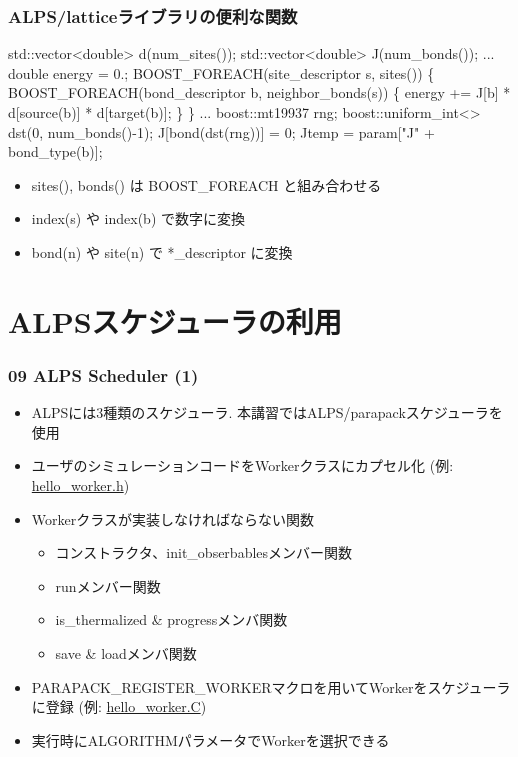 \begin{frame}[fragile,shrink=10] \frametitle{ALPS/latticeライブラリの便利な関数}
\begin{semiverbatim}
std::vector<double> d(\alert{num_sites()});
std::vector<double> J(\alert{num_bonds()});
...
double energy = 0.;
BOOST\_FOREACH(site_descriptor s, \alert{sites()}) \{
  BOOST\_FOREACH(bond_descriptor b, \alert{neighbor_bonds(s)}) \{
    energy += J[b] * d[\alert{source(b)}] * d[\alert{target(b)}];
  \}
\}
...
boost::mt19937 rng;
boost::uniform_int<> dst(0, \alert{num_bonds()}-1);
J[\alert{bond(dst(rng))}] = 0;
Jtemp = param["J" + \alert{bond_type(b)}];
\end{semiverbatim}
  \begin{itemize}
  \item sites(), bonds() は BOOST\_FOREACH と組み合わせる
  \item index(s) や index(b) で数字に変換
  \item bond(n) や site(n) で *\_descriptor に変換
  \end{itemize}
\end{frame}

\section{ALPSスケジューラの利用}
\begin{frame}[fragile]
  \frametitle{09 ALPS Scheduler (1)}
  \begin{itemize}
    \item ALPSには3種類のスケジューラ. 本講習ではALPS/parapackスケジューラを使用
    \item ユーザのシミュレーションコードをWorkerクラスにカプセル化 (例: \href{https://github.com/cmsi/alps-tutorial/blob/develop/alpsize/09-hello_worker.h}{hello\_worker.h})
    \item Workerクラスが実装しなければならない関数
      \begin{itemize}
        \item コンストラクタ、init\_obserbablesメンバー関数
        \item runメンバー関数
        \item is\_thermalized \& progressメンバ関数
        \item save \& loadメンバ関数
      \end{itemize}
    \item PARAPACK\_REGISTER\_WORKERマクロを用いてWorkerをスケジューラに登録 (例: \href{https://github.com/cmsi/alps-tutorial/blob/develop/alpsize/09-hello_worker.C}{hello\_worker.C})
    \item 実行時にALGORITHMパラメータでWorkerを選択できる
  \end{itemize}
\end{frame}

